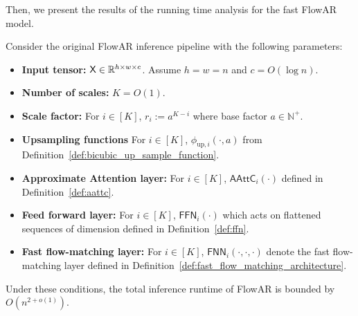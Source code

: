 Then, we present the results of the running time analysis for the fast FlowAR model.
\begin{lemma}\label{lem:runtime_fast_flowar_informal}
    Consider the original FlowAR inference pipeline with the following parameters:
    \begin{itemize}
        \item {\bf Input tensor:} $\mathsf{X} \in \mathbb{R}^{h \times w \times c}$. Assume $h=w=n$ and $c = O(\log n)$.
        \item {\bf Number of scales:} $K = O(1)$.
        \item {\bf Scale factor:} For $i \in [K]$, $r_i:= a^{K-i}$ where base factor $a \in \mathbb{N}^+$.
        \item {\bf Upsampling functions}  For $i \in [K]$, $\phi_{\mathrm{up},i}(\cdot,a)$ from Definition~\ref{def:bicubic_up_sample_function}.
        \item {\bf Approximate Attention layer:}  For $i \in [K]$, $\mathsf{AAttC}_i(\cdot)$ defined in Definition~\ref{def:aattc}.
        \item {\bf Feed forward layer: } For $i \in [K]$, $\mathsf{FFN}_i(\cdot)$ which acts on flattened sequences of dimension defined in Definition~\ref{def:ffn}.
        \item {\bf Fast flow-matching layer:} For $i \in [K]$, $\mathsf{FNN}_i(\cdot,\cdot,\cdot)$ denote the fast flow-matching layer defined in Definition~\ref{def:fast_flow_matching_architecture}.
    \end{itemize}
    Under these conditions, the total inference runtime of FlowAR is bounded by $O(n^{2+o(1)})$.
\end{lemma}

